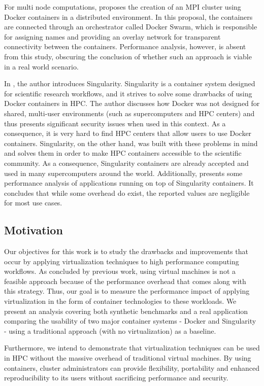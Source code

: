 \documentclass[12pt]{article}
\begin{document}
For multi node computations, \cite{7868429} proposes the creation of
an MPI cluster using Docker containers in a distributed
environment. In this proposal, the containers are connected through an
orchestrator called Docker Swarm, which is responsible for assigning
names and providing an overlay network for transparent connectivity
between the containers. Performance analysis, however, is absent from
this study, obscuring the conclusion of whether such an approach is
viable in a real world scenario.

In \cite{10.1371/journal.pone.0177459}, the author introduces
Singularity. Singularity is a container system designed for scientific
research workflows, and it strives to solve some drawbacks of using
Docker containers in HPC. The author discusses how Docker was not
designed for shared, multi-user environments (such as supercomputers
and HPC centers) and thus presents significant security issues when
used in this context. As a consequence, it is very hard to find HPC
centers that allow users to use Docker containers. Singularity, on the
other hand, was built with these problems in mind and solves them in
order to make HPC containers accessible to the scientific
community. As a consequence, Singularity containers are already
accepted and used in many supercomputers around the
world. Additionally, \cite{Le:2017:PAA:3093338.3106737} presents some
performance analysis of applications running on top of Singularity
containers. It concludes that while some overhead do exist, the
reported values are negligible for most use cases.

\subsection{Motivation}
Our objectives for this work is to study the drawbacks and
improvements that occur by applying virtualization techniques to high
performance computing workflows. As concluded by previous work, using
virtual machines is not a feasible approach because of the performance
overhead that comes along with this strategy. Thus, our goal is to
measure the performance impact of applying virtualization in the form
of container technologies to these workloads. We present an analysis
covering both synthetic benchmarks and a real application comparing
the usability of two major container systems - Docker and Singularity
- using a traditional approach (with no virtualization) as a baseline.

Furthermore, we intend to demonstrate that virtualization techniques
can be used in HPC without the massive overhead of traditional virtual
machines. By using containers, cluster administrators can provide
flexibility, portability and enhanced reproducibility to its users
without sacrificing performance and security.
\end{document}
